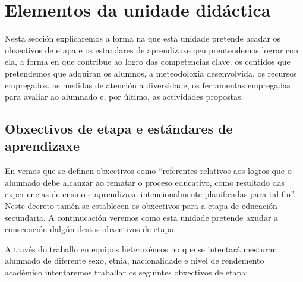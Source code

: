 \section{Elementos da unidade didáctica}
Nesta sección explicaremos a forma na que esta unidade pretende acadar os obxectivos de etapa e os estandares de aprendizaxe qeu prentendemos lograr con ela, a forma en que contribue ao logro das competencias clave, os contidos que pretendemos que adquiran os alumnos, a meteodoloxía desenvolvida, os recursos empregados, as medidas de atención a diversidade, os ferramentas empregadas para avaliar ao alumnado e, por último, as actividades propostas.

\subsection{Obxectivos de etapa e estándares de aprendizaxe}

En \cite{dogcurrlomce} vemos que se definen obxectivos como ``referentes relativos aos logros que o alumnado debe alcanzar ao rematar o proceso educativo, como resultado das experiencias de ensino e aprendizaxe intencionalmente planificadas para tal fin''. Neste decreto tamén se establecen os obxectivos para a etapa de educación secundaria. A continucación veremos como esta unidade pretende axudar a consecución dalgún destos obxectivos de etapa.

A través do traballo en equipos heteroxéneos no que se intentará mesturar alumnado de diferente sexo, etnia, nacionalidade e nivel de rendemento académico intentaremos traballar os seguintes obxectivos de etapa:

